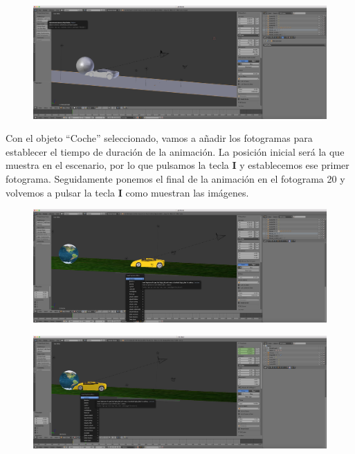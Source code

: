 \documentclass[10pt]{article}
\begin{document}
\begin{figure}[H]
	\begin{center}
	 		\includegraphics[width = 1.00\textwidth]{Imagenes/p5-img11}
	\end{center} 
\end{figure}

Con el objeto ``Coche'' seleccionado, vamos a añadir los fotogramas para establecer el tiempo de duración de la animación. La posición inicial será la que muestra en el escenario, por lo que pulsamos la tecla \textbf{I} y establecemos ese primer fotograma. Seguidamente ponemos el final de la animación en el fotograma 20 y volvemos a pulsar la tecla \textbf{I} como muestran las imágenes. \\

\begin{figure}[H]
	\begin{center}
	 		\includegraphics[width = 1.00\textwidth]{Imagenes/p5-img12}
	\end{center} 
\end{figure}

\begin{figure}[H]
	\begin{center}
	 		\includegraphics[width = 1.00\textwidth]{Imagenes/p5-img13}
	\end{center} 
\end{figure}
\end{document}

